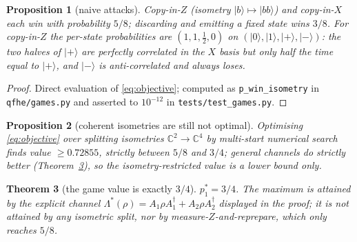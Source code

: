 \documentclass[11pt]{article}
\newtheorem{theorem}{Theorem}[section]
\newtheorem{proposition}[theorem]{Proposition}
\theoremstyle{definition}
\begin{document}
\begin{proposition}[naive attacks]\label{prop:naive}
Copy-in-$Z$ (isometry $|b\rangle \mapsto |bb\rangle$) and copy-in-$X$ each win
with probability $5/8$; discarding and emitting a fixed state wins $3/8$.  For
copy-in-$Z$ the per-state probabilities are $(1, 1, \tfrac12, 0)$ on
$(|0\rangle, |1\rangle, |+\rangle, |-\rangle)$: the two halves of $|+\rangle$
are perfectly correlated in the $X$ basis but only half the time equal to $|+\rangle$,
and $|-\rangle$ is anti-correlated and always loses.
\end{proposition}

\begin{proof}
Direct evaluation of \eqref{eq:objective}; computed as
\texttt{p\_win\_isometry} in \texttt{qfhe/games.py} and asserted to $10^{-12}$
in \texttt{tests/test\_games.py}.
\end{proof}

\begin{proposition}[coherent isometries are still not optimal]\label{prop:iso}
Optimising \eqref{eq:objective} over splitting \emph{isometries}
$\mathbb{C}^2 \to \mathbb{C}^4$ by multi-start numerical search finds value
$\ge 0.72855$, strictly between $5/8$ and $3/4$; general channels do strictly
better (Theorem~\ref{thm:value}), so the isometry-restricted value is a lower
bound only.
\end{proposition}

\begin{theorem}[the game value is exactly $3/4$]\label{thm:value}
$p_1^\ast = 3/4$.  The maximum is attained by the explicit channel
$\Lambda^\ast(\rho) = A_1 \rho A_1^\dagger + A_2 \rho A_2^\dagger$ displayed in
the proof; it is not attained by any isometric split, nor by
measure-$Z$-and-reprepare, which only reaches $5/8$.
\end{theorem}
\end{document}
